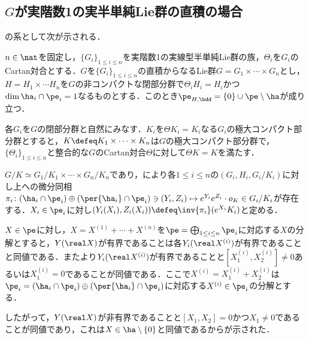 \subsection{$G$が実階数1の実半単純Lie群の直積の場合}
の系として次が示される．
\begin{cor}\label{cor:0113-main}
  $n\in \nat$を固定し，$\{G_i \}_{1\leq i\leq n} $を実階数1の実線型半単純Lie群の族，$\Theta_i $を$G_i$のCartan対合とする．$G$を$\{G_i \}_{1\leq i\leq n} $の直積からなるLie群$G = G_1\times \cdots \times G_n $とし，$H = H_1\times \cdots H_n $を$G$の非コンパクトな閉部分群で$\Theta_i H_i = H_i$かつ$\dim \ha_i \cap\pe_i = 1$なるものとする．このとき$\pe_{H,\bdd} = \{0\}\cup\pe\setminus\ha $が成り立つ．
\end{cor}


  
\begin{npfwn}  
  各$G_i $を$G$の閉部分群と自然にみなす．$K_i$を$\Theta K_i = K_i $なる$G_i$の極大コンパクト部分群とすると，$K \defeq K_1\times \cdots \times K_n $は$G$の極大コンパクト部分群で，$\{\Theta_i\}_{1\leq i\leq n} $と整合的な$G$のCartan対合$\Theta$に対して$\Theta K = K $を満たす．

  $G/K\simeq G_1/K_1\times \cdots \times G_n/K_n $であり，により各$1\leq i\leq n$の$(G_i, H_i, G_i/K_i) $に対し上への微分同相$\pi_i\colon  (\ha_i\cap\pe_i)\oplus (\per{\ha_i}\cap \pe_i) \ni (Y_i, Z_i)\mapsto e^{Y_i}e^{Z_i}\cdot o_K \in G_i/K_i $が存在する．$X_i\in \pe_i $に対し$(Y_i(X_i), Z_i(X_i))\defeq \inv{\pi_i}(e^{X_i}K_i) $と定める．

  $X\in \pe$に対し，$X = X^{(1)} +\cdots + X^{(n)} $を$\pe = \bigoplus_{1\leq i\leq n}\pe_i $に対応する$X$の分解とすると，$Y(\real X) $が有界であることは各$Y_i(\real X^{(i)}) $が有界であることと同値である．またより$Y_i(\real X^{(i)}) $が有界であることと$[X_1^{(i)}, X_2^{(i)} ] \neq 0 $あるいは$X^{(i)}_1 = 0 $であることが同値である．ここで$X^{(i)} =  X_1^{(i)} + X_2^{(i)}$は$\pe_i = (\ha_i\cap\pe_i)\oplus (\per{\ha_i}\cap\pe_i) $に対応する$X^{(i)}\in \pe_i $の分解とする．

  したがって，$Y(\real X) $が非有界であることと$[X_1, X_2] = 0 $かつ$X_1 \neq 0 $であることが同値であり，これは$X\in \ha\setminus\{0\} $と同値であるからが示された．  
\end{npfwn}
